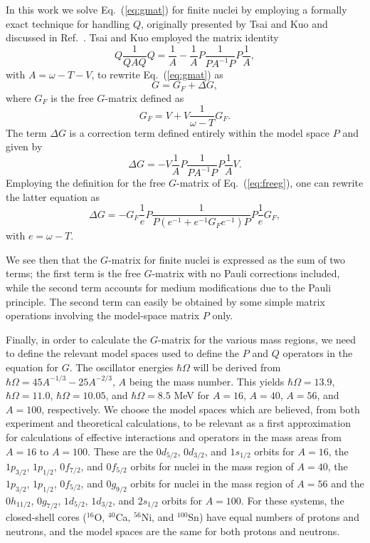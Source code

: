 In this work we solve Eq.\ (\ref{eq:gmat}) for finite nuclei by 
employing a formally exact technique for handling $Q$, originally 
presented by Tsai and Kuo \cite{tk72} and discussed in Ref.\ 
\cite{kkko76}. Tsai and Kuo employed the matrix identity
\begin{equation}
  Q\frac{1}{QAQ}
  Q=\frac{1}{A}-
  \frac{1}{A}P\frac{1}{P
    A^{-1}P}P\frac{1}{A},
\end{equation}
with $A=\omega -T-V$, to rewrite Eq.\ (\ref{eq:gmat}) as
\begin{equation}
  G = G_{F} +\Delta G,\label{eq:gmod}
\end{equation}
where $G_{F}$ is the free $G$-matrix defined as
\begin{equation}
  G_{F}=V+V\frac{1}{\omega - T}G_{F}. \label{eq:freeg}
\end{equation}
The term $\Delta G$ is a correction term defined entirely within the
model space $P$ and given by
\begin{equation}
  \Delta G =-V\frac{1}{A}P
  \frac{1}{PA^{-1}P}P\frac{1}{A}V.
\end{equation}
Employing the definition for the free $G$-matrix of Eq.\ (\ref{eq:freeg}),
one can rewrite the latter equation as
\begin{equation}
  \Delta G =-G_{F}\frac{1}{e}P
  \frac{1}{P(e^{-1}+e^{-1}G_{F}e^{-1})
    P}P\frac{1}{e}G_F,
\end{equation}
with $e=\omega -T$.

We see then that the $G$-matrix for finite nuclei is expressed as the sum 
of two terms; the first term is the free $G$-matrix with no Pauli corrections
included, while the second term accounts for medium modifications
due to the Pauli principle. The second term can easily be obtained by some 
simple matrix operations involving the model-space matrix $P$ only. 

Finally, in order to calculate the $G$-matrix for the various mass regions,
we need to define the relevant model spaces used to define the $P$ and
$Q$ operators in the equation for $G$. The oscillator energies  
$\hbar\Omega$ will be derived from $\hbar\Omega = 45A^{-1/3} - 25A^{-2/3}$, 
$A$ being the mass number. This yields $\hbar\Omega =13.9$,
$\hbar\Omega =11.0$, $\hbar\Omega =10.05$, and $\hbar\Omega =8.5$ 
MeV for $A=16$, $A=40$, $A=56$, and $A=100$, respectively.
We choose the model spaces which are believed, from
both experiment and theoretical calculations, to be relevant
as a first approximation for calculations of effective
interactions and operators 
in the mass areas from $A=16$ to $A=100$. These are
the $0d_{5/2}$, $0d_{3/2}$, and $1s_{1/2}$ orbits
for $A=16$, the $1p_{3/2}$, $1p_{1/2}$, $0f_{7/2}$, and $0f_{5/2}$ orbits
for nuclei in the mass region of $A=40$, the $1p_{3/2}$,
$1p_{1/2}$, $0f_{5/2}$, and $0g_{9/2}$ orbits
for nuclei in the mass region of $A=56$ and the
$0h_{11/2}$, $0g_{7/2}$, $1d_{5/2}$, $1d_{3/2}$, and $2s_{1/2}$ orbits
for $A=100$. For these systems, the closed-shell cores ($^{16}$O,
$^{40}$Ca, $^{56}$Ni, and $^{100}$Sn) have equal numbers of protons and neutrons,
and the model spaces are the same for both protons and neutrons. 

